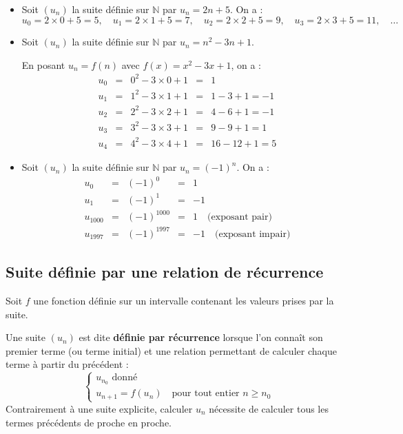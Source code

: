\begin{ex}
	\nline
	\begin{itemize}
		\item Soit $(u_n)$ la suite définie sur $\mathbb{N}$ par $u_n = 2n + 5$. On a :
		      \[
			      u_0 = 2 \times 0 + 5 = 5, \quad u_1 = 2 \times 1 + 5 = 7, \quad u_2 = 2 \times 2 + 5 = 9, \quad u_3 = 2 \times 3 + 5 = 11, \quad\ldots
		      \]

		\item Soit $(u_n)$ la suite définie sur $\mathbb{N}$ par $u_n = n^2 - 3n + 1$.

		      En posant $u_n = f(n)$ avec $f(x) = x^2 - 3x + 1$, on a :
		      \[
			      \begin{array}{rclcl}
				      u_0 & = & 0^2 - 3 \times 0 + 1 & = & 1               \\
				      u_1 & = & 1^2 - 3 \times 1 + 1 & = & 1 - 3 + 1 = -1  \\
				      u_2 & = & 2^2 - 3 \times 2 + 1 & = & 4 - 6 + 1 = -1  \\
				      u_3 & = & 3^2 - 3 \times 3 + 1 & = & 9 - 9 + 1 = 1   \\
				      u_4 & = & 4^2 - 3 \times 4 + 1 & = & 16 - 12 + 1 = 5
			      \end{array}
		      \]

		\item Soit $(u_n)$ la suite définie sur $\mathbb{N}$ par $u_n = (-1)^n$. On a :
		      \[
			      \begin{array}{rclcl}
				      u_0      & = & (-1)^0      & = & 1                                 \\
				      u_1      & = & (-1)^1      & = & -1                                \\
				      u_{1000} & = & (-1)^{1000} & = & 1 \quad \text{(exposant pair)}    \\
				      u_{1997} & = & (-1)^{1997} & = & -1 \quad \text{(exposant impair)}
			      \end{array}
		      \]
	\end{itemize}
\end{ex}

\subsection{Suite définie par une relation de récurrence}

\begin{defin}
	Soit $f$ une fonction définie sur un intervalle contenant les valeurs prises par la suite.

	Une suite $(u_n)$ est dite \textbf{définie par récurrence} lorsque l'on connaît son premier terme (ou terme initial) et une relation permettant de calculer chaque terme à partir du précédent :
	\[
		\begin{cases}
			u_{n_0} \text{ donné} \\
			u_{n+1} = f(u_n) \quad \text{pour tout entier } n \geq n_0
		\end{cases}
	\]
	Contrairement à une suite explicite, calculer $u_n$ nécessite de calculer tous les termes précédents de proche en proche.
\end{defin}

